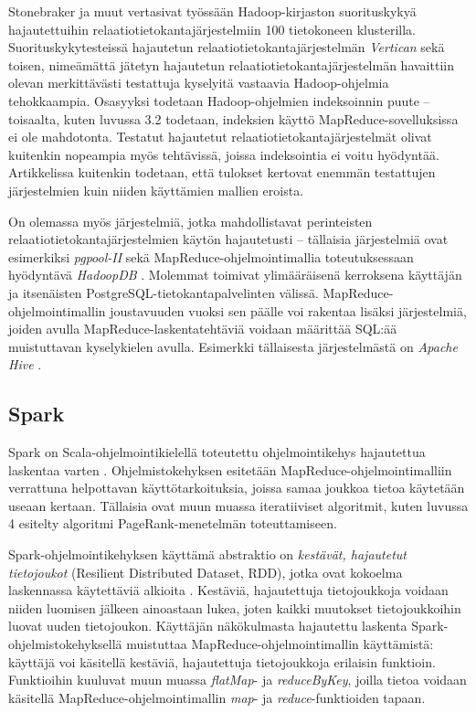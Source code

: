 \documentclass[finnish]{templates/tktltiki2}
\theoremstyle{definition}
\theoremstyle{remark}
\begin{document}
Stonebraker ja muut vertasivat työssään \cite{mapreduce-comparison2}
Hadoop-kirjaston suorituskykyä hajautettuihin
relaatiotietokantajärjestelmiin 100 tietokoneen klusterilla.
Suorituskykytesteissä hajautetun relaatiotietokantajärjestelmän
\emph{Vertican} sekä toisen, nimeämättä jätetyn hajautetun
relaatiotietokantajärjestelmän havaittiin olevan merkittävästi
testattuja kyselyitä vastaavia Hadoop-ohjelmia tehokkaampia. Osasyyksi
todetaan Hadoop-ohjelmien indeksoinnin puute -- toisaalta, kuten luvussa
3.2 todetaan, indeksien käyttö MapReduce-sovelluksissa ei ole
mahdotonta. Testatut hajautetut relaatiotietokantajärjestelmät olivat
kuitenkin nopeampia myös tehtävissä, joissa indeksointia ei voitu
hyödyntää. Artikkelissa kuitenkin todetaan, että tulokset kertovat
enemmän testattujen järjestelmien kuin niiden käyttämien mallien
eroista.

On olemassa myös järjestelmiä, jotka mahdollistavat perinteisten
relaatiotietokantajärjestelmien käytön hajautetusti -- tällaisia
järjestelmiä ovat esimerkiksi \emph{pgpool-II} \cite{pgpool-site}
sekä MapReduce-ohjelmointimallia toteutuksessaan hyödyntävä
\emph{HadoopDB} \cite{hadoopdb}. Molemmat toimivat ylimääräisenä
kerroksena käyttäjän ja itsenäisten PostgreSQL-tietokantapalvelinten
välissä. MapReduce-ohjelmointimallin joustavuuden vuoksi sen päälle voi
rakentaa lisäksi järjestelmiä, joiden avulla MapReduce-laskentatehtäviä
voidaan määrittää SQL:ää muistuttavan kyselykielen avulla. Esimerkki
tällaisesta järjestelmästä on \emph{Apache Hive} \cite{hive}.

\subsection{Spark}\label{spark}

Spark on Scala-ohjelmointikielellä toteutettu ohjelmointikehys
hajautettua laskentaa varten \cite{spark}. Ohjelmistokehyksen
esitetään MapReduce-ohjelmointimalliin verrattuna helpottavan
käyttötarkoituksia, joissa samaa joukkoa tietoa käytetään useaan
kertaan. Tällaisia ovat muun muassa iteratiiviset algoritmit, kuten
luvussa 4 esitelty algoritmi PageRank-menetelmän toteuttamiseen.

Spark-ohjelmointikehyksen käyttämä abstraktio on \emph{kestävät,
hajautetut tietojoukot} (Resilient Distributed Dataset, RDD), jotka ovat
kokoelma laskennassa käytettäviä alkioita \cite{rdd}. Kestäviä,
hajautettuja tietojoukkoja voidaan niiden luomisen jälkeen ainoastaan
lukea, joten kaikki muutokset tietojoukkoihin luovat uuden tietojoukon.
Käyttäjän näkökulmasta hajautettu laskenta Spark-ohjelmistokehyksellä
muistuttaa MapReduce-ohjelmointimallin käyttämistä: käyttäjä voi
käsitellä kestäviä, hajautettuja tietojoukkoja erilaisin funktioin.
Funktioihin kuuluvat muun muassa \emph{flatMap}- ja \emph{reduceByKey},
joilla tietoa voidaan käsitellä MapReduce-ohjelmointimallin \emph{map}-
ja \emph{reduce}-funktioiden tapaan.
\end{document}
